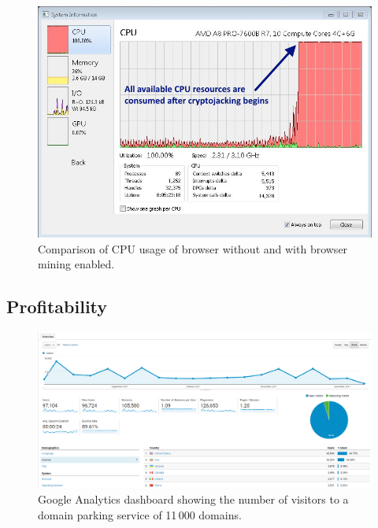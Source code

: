 \begin{figure}[h]
\centering
\includegraphics[width=\linewidth]{figures/windows_cpu_usage.png}
	\caption[Cryptojacking CPU usage]{Comparison of CPU usage of browser without and with browser mining enabled.}\label{fig:cpu}
\end{figure}


\subsection{Profitability}
\label{profitabilitexperiment}

\begin{figure}[t]
\centering
\includegraphics[width=\linewidth]{figures/experiment_analytics_results.png}
\caption[Google Analytics dashboard]{Google Analytics dashboard showing the number of visitors to a domain parking service of 11\,000 domains.}\label{fig:domain2}
\end{figure}


